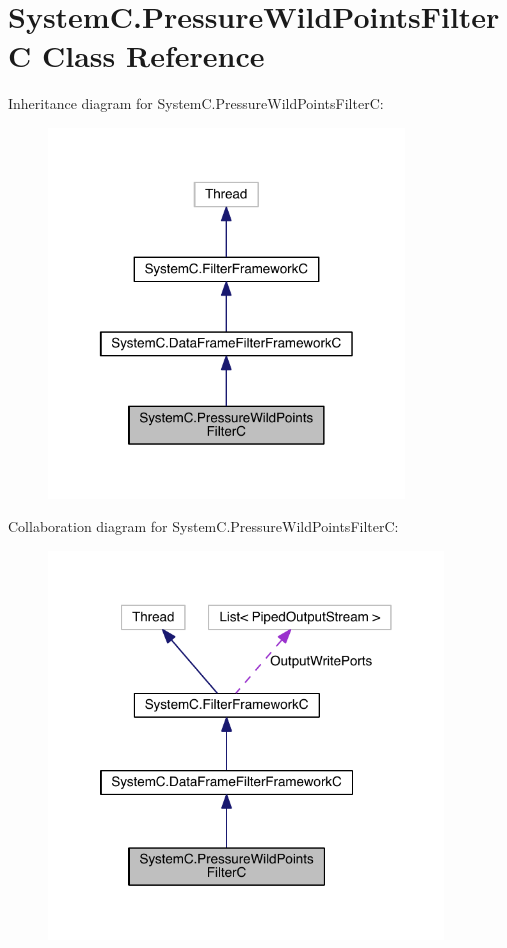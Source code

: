 \hypertarget{class_system_c_1_1_pressure_wild_points_filter_c}{}\section{System\+C.\+Pressure\+Wild\+Points\+Filter\+C Class Reference}
\label{class_system_c_1_1_pressure_wild_points_filter_c}


Inheritance diagram for System\+C.\+Pressure\+Wild\+Points\+Filter\+C\+:\nopagebreak
\begin{figure}[H]
\begin{center}
\leavevmode
\includegraphics[width=268pt]{class_system_c_1_1_pressure_wild_points_filter_c__inherit__graph}
\end{center}
\end{figure}


Collaboration diagram for System\+C.\+Pressure\+Wild\+Points\+Filter\+C\+:\nopagebreak
\begin{figure}[H]
\begin{center}
\leavevmode
\includegraphics[width=297pt]{class_system_c_1_1_pressure_wild_points_filter_c__coll__graph}
\end{center}
\end{figure}
